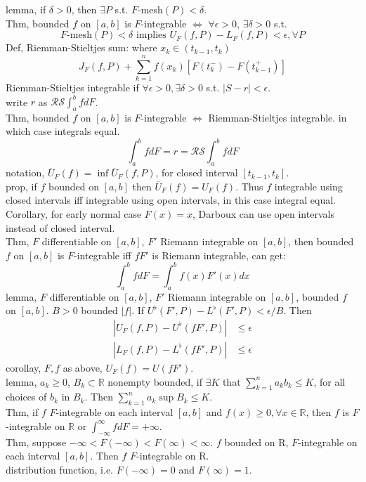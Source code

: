 \documentclass[paper=a4, fontsize=11pt]{scrartcl} %
\numberwithin{equation}{section} %
\numberwithin{figure}{section} %
\numberwithin{table}{section} %
\begin{document}
lemma, if $\delta>0$, then $\exists P$ s.t. $F$-mesh$(P)<\delta$.\\
Thm, bounded $f$ on $[a,b]$ is $F$-integrable $\Leftrightarrow$ $\forall\epsilon>0$, $\exists \delta>0$ s.t.
\begin{equation}
	F\text{-mesh}(P)<\delta \text{ implies } U_F(f,P) - L_F(f,P)<\epsilon,\forall P
\end{equation}
Def, Riemman-Stieltjes sum: where $x_k\in(t_{k-1}, t_k)$
\begin{equation}
	J_F(f,P) + \sum_{k=1}^n f(x_k) [F(t_k^-) - F(t_{k-1}^+)]
\end{equation}
Riemman-Stieltjes integrable if $\forall \epsilon>0, \exists \delta>0$ s.t. $|S-r|<\epsilon$.\\
write $r$ as $\mathcal{RS}\int_a^b fdF$.\\
Thm, bounded $f$ on $[a,b]$ is $F$-integrable $\Leftrightarrow$ Riemman-Stieltjes integrable. in which case integrals equal.
\begin{equation}
	\int_a^b fdF = r = \mathcal{RS}\int_a^b fdF
\end{equation}
notation, $\overline{U}_F(f)=\inf \overline{U}_F(f,P)$, for closed interval $[t_{k-1},t_k]$.\\
prop, if $f$ bounded on $[a,b]$ then $\overline{U}_F(f) = U_F(f)$. Thus $f$ integrable using closed intervals iff integrable using open intervals, in this case integral equal.\\
Corollary, for early normal case $F(x)=x$, Darboux can use open intervals instead of closed interval.\\
Thm, $F$ differentiable on $[a,b]$, $F'$ Riemann integrable on $[a,b]$, then bounded $f$ on $[a,b]$ is $F$-integrable iff $fF'$ is Riemann integrable, can get:
\begin{equation}
	\int_a^b fdF = \int_a^b f(x)F'(x)dx
\end{equation}
lemma, $F$ differentiable on $[a,b]$, $F'$ Riemann integrable on $[a,b]$, bounded $f$ on $[a,b]$. $B>0$ bounded $|f|$. If $U^{\flat}(F',P) - L^{\flat}(F',P) <\epsilon/B$. Then
\begin{align}
|U_F(f,P) - U^{\flat}(fF',P)| &\leq \epsilon \\
|L_F(f,P) - L^{\flat}(fF',P)| &\leq \epsilon
\end{align}
corollay, $F,f$ as above, $U_F(f) = U(fF')$.\\
lemma, $a_k\geq 0$, $B_k\subset \mathbb{R}$ nonempty bounded, if $\exists K$ that $\sum_{k=1}^n  a_kb_k\leq K$, for all choices of $b_k$ in $B_k$. Then $\sum_{k=1}^n a_k\sup B_k\leq K$.\\
Thm, if $f$ $F$-integrable on each interval $[a,b]$ and $f(x)\geq 0,\forall x\in \mathbb{R}$, then $f$ is $F$-integrable on $\mathbb{R}$ or $\int_{-\infty}^\infty fdF = +\infty$.\\
Thm, suppose $-\infty < F(-\infty)<F(\infty)<\infty$. $f$ bounded on R, $F$-integrable on each interval $[a,b]$. Then $f$ $F$-integrable on R.\\
distribution function, i.e. $F(-\infty)=0$ and $F(\infty)=1$.\\
\end{document}
